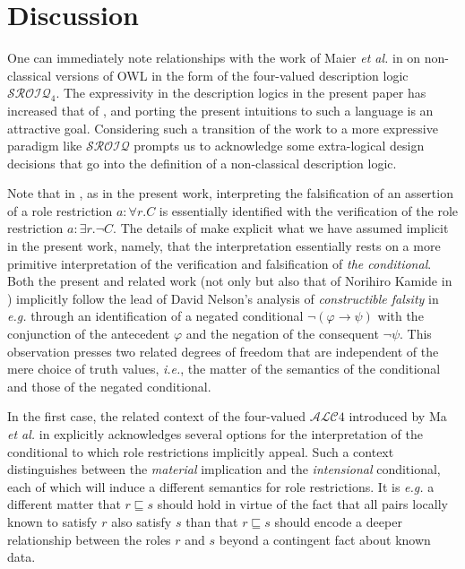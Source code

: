 \documentclass[letterpaper]{article} %
\theoremstyle{definition}
\theoremstyle{definition}
\theoremstyle{definition}
\theoremstyle{definition}
\theoremstyle{definition}
\begin{document}
\section{Discussion}

One can immediately note relationships with the work of Maier \emph{et al.} in \cite{DBLP:journals/semweb/MaierMH13} on non-classical versions of OWL in the form of the four-valued description logic $\mathcal{SROIQ}_{4}$. The expressivity in the description logics in the present paper has increased that of \cite{DBLP:conf/dlog/Ferguson21}, and porting the present intuitions to such a language is an attractive goal. Considering such a transition of the work to a more expressive paradigm like $\mathcal{SROIQ}$ prompts us to acknowledge some extra-logical design decisions that go into the definition of a non-classical description logic.

Note that in \cite{DBLP:journals/semweb/MaierMH13}, as in the present work, interpreting the falsification of an assertion of a role restriction $a:\forall r.C$ is essentially identified with the verification of the role restriction $a:\exists r.\neg C$. The details of \cite{DBLP:journals/semweb/MaierMH13} make explicit what we have assumed implicit in the present work, namely, that the interpretation essentially rests on a more primitive interpretation of the verification and falsification of \emph{the conditional}. Both the present and related work (not only \cite{DBLP:journals/semweb/MaierMH13} but also that of Norihiro Kamide in \cite{DBLP:conf/kes/Kamide11}) implicitly follow the lead of David Nelson's analysis of \emph{constructible falsity} in \emph{e.g.} \cite{DBLP:journals/jsyml/AlmukdadN84} through an identification of a negated conditional $\neg(\varphi\rightarrow\psi)$ with the conjunction of the antecedent $\varphi$ and the negation of the consequent $\neg\psi$. This observation presses two related degrees of freedom that are independent of the mere choice of truth values, \emph{i.e.}, the matter of the semantics of the conditional and those of the negated conditional.

In the first case, the related context of the four-valued $\mathcal{ALC}4$ introduced by Ma \emph{et al.} in \cite{DBLP:conf/esws/MaHL07} explicitly acknowledges several options for the interpretation of the conditional to which role restrictions implicitly appeal. Such a context distinguishes between the \emph{material} implication and the \emph{intensional} conditional, each of which will induce a different semantics for role restrictions. It is \emph{e.g.} a different matter that $r\sqsubseteq s$ should hold in virtue of the fact that all pairs locally known to satisfy $r$ also satisfy $s$ than that $r\sqsubseteq s$ should encode a deeper relationship between the roles $r$ and $s$ beyond a contingent fact about known data.
\end{document}

